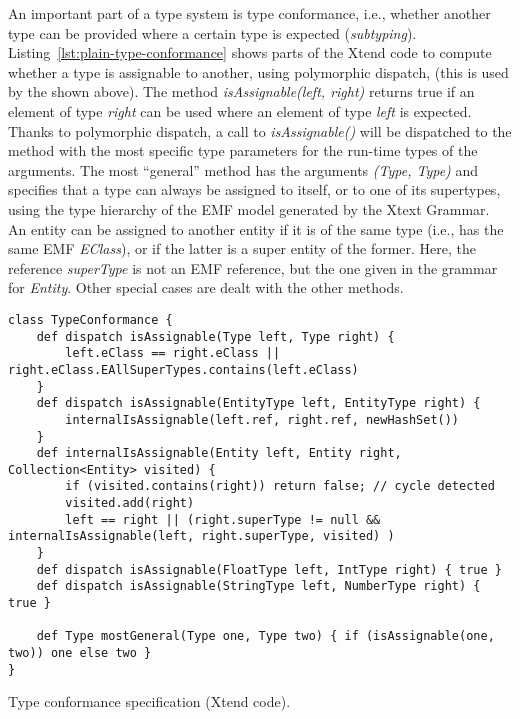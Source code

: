 An important part of a type system is type conformance, i.e., whether another
type can be provided where a certain type is expected (\emph{subtyping}).
Listing~\ref{lst:plain-type-conformance} shows parts of the Xtend code to
compute whether a type is assignable to another, using polymorphic dispatch, (this is used by
the  shown above).
The method
\emph{isAssignable(left, right)} returns true if an element of type \emph{right}
can be used where an element of type \emph{left} is expected.
Thanks to polymorphic dispatch, a call to \emph{isAssignable()} will be
dispatched to the method with the most specific type parameters for the run-time
types of the arguments. The most ``general'' method has the arguments
\emph{(Type, Type)} and specifies that a type can always be assigned to itself,
or to one of its supertypes, using the type hierarchy of the EMF model generated
by the Xtext Grammar.
An entity can be assigned to another entity if it is of the same type (i.e., has
the same EMF \emph{EClass}), or if the latter is a super entity of the former.
Here, the reference \emph{superType} is not an EMF reference, but the one given
in the grammar for \emph{Entity}. Other special cases are dealt with the
other methods. 

\begin{listing}[tb]
\begin{lstlisting}[language=xtend] 
class TypeConformance {
	def dispatch isAssignable(Type left, Type right) {
		left.eClass == right.eClass || right.eClass.EAllSuperTypes.contains(left.eClass) 
	}
	def dispatch isAssignable(EntityType left, EntityType right) {
		internalIsAssignable(left.ref, right.ref, newHashSet())
	}
	def internalIsAssignable(Entity left, Entity right, Collection<Entity> visited) {
		if (visited.contains(right)) return false; // cycle detected
		visited.add(right)
		left == right || (right.superType != null && internalIsAssignable(left, right.superType, visited) )
	}
	def dispatch isAssignable(FloatType left, IntType right) { true }
	def dispatch isAssignable(StringType left, NumberType right) { true }

	def Type mostGeneral(Type one, Type two) { if (isAssignable(one, two)) one else two }
}
\end{lstlisting}
\caption{Type conformance specification (Xtend code).}
\label{lst:plain-type-conformance}
\end{listing}

